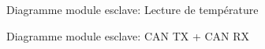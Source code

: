 		\begin{figure}[H]
			\centering
			\caption{Diagramme module esclave: Lecture de température}
			\label{fig:diagrammefonctionnelslavelecturetemperature}
		\end{figure}

		\begin{figure}[H]
			\centering
			\caption{Diagramme module esclave: CAN TX + CAN RX}
			\label{fig:diagrammefonctionnelslavecan}
		\end{figure}

